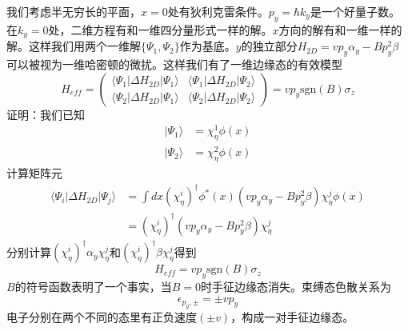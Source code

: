 \documentclass{article}
\numberwithin{equation}{subsection}
\begin{document}
我们考虑半无穷长的平面，$x=0$处有狄利克雷条件。$p_y=\hbar k_y$是一个好量子数。在$k_y=0$处，二维方程有和一维四分量形式一样的解。$x$方向的解有和一维一样的解。这样我们用两个一维解$\{\Psi_1,\Psi_2\}$作为基底。$y$的独立部分$H_{2D}=vp_y\alpha_y-Bp_y^2\beta$可以被视为一维哈密顿的微扰。这样我们有了一维边缘态的有效模型
\begin{equation}
    H_{eff}=\begin{pmatrix}
        \langle\Psi_1|\Delta H_{2D}|\Psi_1\rangle&\langle\Psi_1|\Delta H_{2D}|\Psi_2\rangle\\
        \langle\Psi_2|\Delta H_{2D}|\Psi_1\rangle&\langle\Psi_2|\Delta H_{2D}|\Psi_2\rangle
    \end{pmatrix}=vp_y\mathrm{sgn}(B)\sigma_z
\end{equation}
证明：我们已知
\begin{equation}
    \begin{split}
        |\Psi_1\rangle&=\chi_\eta^1\phi(x)\\
        |\Psi_2\rangle&=\chi_\eta^2\phi(x)
    \end{split}
\end{equation}
计算矩阵元
\begin{equation}
    \begin{split}
        \langle\Psi_i|\Delta H_{2D}|\Psi_j\rangle&=\int dx(\chi_\eta^i)^\dagger\phi^*(x)(vp_y\alpha_y-Bp_y^2\beta)\chi_\eta^j\phi(x)\\
        &=(\chi_\eta^i)^\dagger(vp_y\alpha_y-Bp_y^2\beta)\chi_\eta^j
    \end{split}
\end{equation}
分别计算$(\chi_\eta^i)^\dagger\alpha_y\chi_\eta^j$和$(\chi_\eta^i)^\dagger\beta\chi_\eta^j$得到
\begin{equation}
    H_{eff}=vp_y\mathrm{sgn}(B)\sigma_z
\end{equation}
$B$的符号函数表明了一个事实，当$B=0$时手征边缘态消失。束缚态色散关系为
\begin{equation}
    \epsilon_{p_y,\pm}=\pm vp_y
\end{equation}
电子分别在两个不同的态里有正负速度$(\pm v)$，构成一对手征边缘态。
\end{document}
